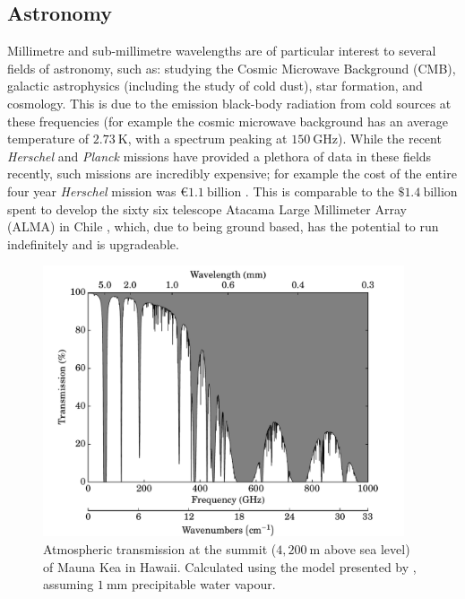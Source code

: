\subsection{Astronomy}
Millimetre and sub-millimetre wavelengths are of particular interest to several fields of astronomy, such as: studying the Cosmic Microwave Background (CMB), galactic astrophysics (including the study of cold dust), star formation, and cosmology. This is due to the emission black-body radiation from cold sources at these frequencies (for example the cosmic microwave background has an average temperature of $2.73~\mathrm{K}$, with a spectrum peaking at $150~\mathrm{GHz}$). While the recent \textit{Herschel} and \textit{Planck} missions have provided a plethora of data in these fields recently, such missions are incredibly expensive; for example the cost of the entire four year \textit{Herschel} mission was $\euro{} 1.1~\mathrm{billion}$ \parencite[$\approx \$ 1.2~\mathrm{billion}$;][]{HerschelFactSheet}. This is comparable to the $\$ 1.4~\mathrm{billion}$ spent to develop the sixty six telescope Atacama Large Millimeter Array (ALMA) in Chile \parencite{ESO2013}, which, due to being ground based, has the potential to run indefinitely and is upgradeable.
\begin{figure}[tb]
\begin{center}
\includegraphics[width = 0.95\textwidth]{figures/MaunaKeaTransmission}
\caption[Atmospheric transmission at the summit of Mauna Kea in Hawaii]{Atmospheric transmission at the summit ($4,200~\mathrm{m}$ above sea level) of Mauna Kea in Hawaii. Calculated using the model presented by \textcite{Pardo2001}, assuming $1~\mathrm{mm}$ precipitable water vapour.}
\label{fig:MaunaKeaTransmission}
\end{center}
\end{figure}
